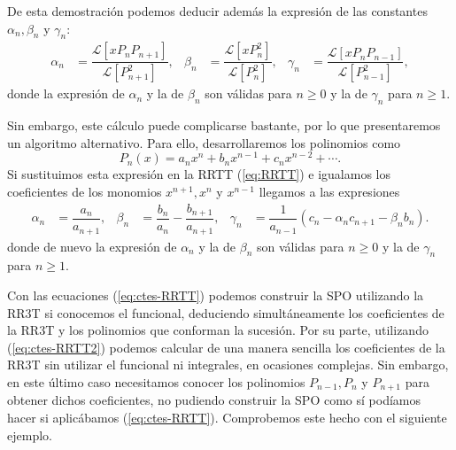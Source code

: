 De esta demostración podemos deducir además la expresión de las constantes $\alpha_n, \beta_n$ y $\gamma_n$:
\begin{align}
    \label{eq:ctes-RRTT}
    \alpha_n &= \dfrac{\mathcal{L}[xP_n P_{n+1}]}{\mathcal{L}[P_{n+1}^2]}, & \beta_n &= \dfrac{\mathcal{L}[xP_n^2]}{\mathcal{L}[P_n^2]}, & \gamma_n &= \dfrac{\mathcal{L}[xP_n P_{n-1}]}{\mathcal{L}[P_{n-1}^2]},
\end{align}
donde la expresión de $\alpha_n$ y la de $\beta_n$ son válidas para $n\geq 0$ y la de $\gamma_n$ para $n\geq 1$.

Sin embargo, este cálculo puede complicarse bastante, por lo que presentaremos un algoritmo alternativo. Para ello, desarrollaremos los polinomios como
$$
P_n(x) = a_n x^n + b_n x^{n-1} + c_n x^{n-2} + \cdots.
$$
Si sustituimos esta expresión en la RRTT (\ref{eq:RRTT}) e igualamos los coeficientes de los monomios $x^{n+1}, x^n$ y $x^{n-1}$ llegamos a las expresiones
\begin{align}
    \label{eq:ctes-RRTT2}
    \alpha_n &= \dfrac{a_n}{a_{n+1}}, & \beta_n &= \dfrac{b_n}{a_n}-\dfrac{b_{n+1}}{a_{n+1}}, & \gamma_n &= \dfrac{1}{a_{n-1}}\left(c_n - \alpha_n c_{n+1} - \beta_n b_n\right).
\end{align}
donde de nuevo la expresión de $\alpha_n$ y la de $\beta_n$ son válidas para $n\geq 0$ y la de $\gamma_n$ para $n\geq 1$.

Con las ecuaciones (\ref{eq:ctes-RRTT}) podemos construir la SPO utilizando la RR3T si conocemos el funcional, deduciendo simultáneamente los coeficientes de la RR3T y los polinomios que conforman la sucesión. Por su parte, utilizando (\ref{eq:ctes-RRTT2}) podemos calcular de una manera sencilla los coeficientes de la RR3T sin utilizar el funcional ni integrales, en ocasiones complejas. Sin embargo, en este último caso necesitamos conocer los polinomios $P_{n-1}, P_n$ y $P_{n+1}$ para obtener dichos coeficientes, no pudiendo construir la SPO como sí podíamos hacer si aplicábamos (\ref{eq:ctes-RRTT}). Comprobemos este hecho con el siguiente ejemplo.

